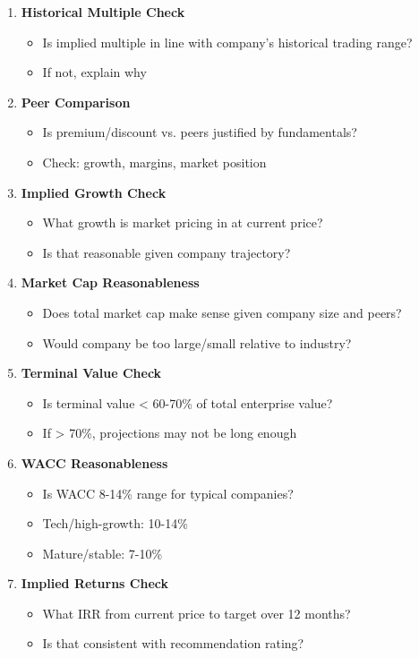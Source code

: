 \documentclass[11pt]{article}
\begin{document}
\begin{enumerate}[leftmargin=*,itemsep=2pt,topsep=2pt]
\item {} \textbf{Historical Multiple Check}
\begin{itemize}[leftmargin=*,itemsep=2pt,topsep=2pt]
\item {} Is implied multiple in line with company's historical trading range?
\item {} If not, explain why
\end{itemize}
\item {} \textbf{Peer Comparison}
\begin{itemize}[leftmargin=*,itemsep=2pt,topsep=2pt]
\item {} Is premium/discount vs. peers justified by fundamentals?
\item {} Check: growth, margins, market position
\end{itemize}
\item {} \textbf{Implied Growth Check}
\begin{itemize}[leftmargin=*,itemsep=2pt,topsep=2pt]
\item {} What growth is market pricing in at current price?
\item {} Is that reasonable given company trajectory?
\end{itemize}
\item {} \textbf{Market Cap Reasonableness}
\begin{itemize}[leftmargin=*,itemsep=2pt,topsep=2pt]
\item {} Does total market cap make sense given company size and peers?
\item {} Would company be too large/small relative to industry?
\end{itemize}
\item {} \textbf{Terminal Value Check}
\begin{itemize}[leftmargin=*,itemsep=2pt,topsep=2pt]
\item {} Is terminal value < 60-70\% of total enterprise value?
\item {} If > 70\%, projections may not be long enough
\end{itemize}
\item {} \textbf{WACC Reasonableness}
\begin{itemize}[leftmargin=*,itemsep=2pt,topsep=2pt]
\item {} Is WACC 8-14\% range for typical companies?
\item {} Tech/high-growth: 10-14\%
\item {} Mature/stable: 7-10\%
\end{itemize}
\item {} \textbf{Implied Returns Check}
\begin{itemize}[leftmargin=*,itemsep=2pt,topsep=2pt]
\item {} What IRR from current price to target over 12 months?
\item {} Is that consistent with recommendation rating?
\end{itemize}
\end{enumerate}
\end{document}
